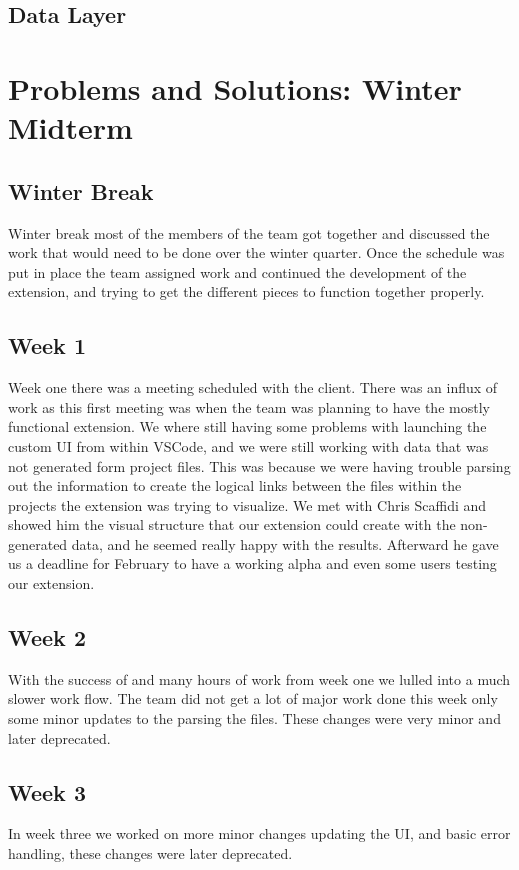 \documentclass[letterpaper,10pt,titlepage,draftclsnofoot,onecolumn,onesided] {IEEEtran}
\begin{document}
	\subsection{Data Layer}

\section{Problems and Solutions: Winter Midterm }
	\subsection{Winter Break}
	Winter break most of the members of the team got together and discussed the work that would need to be done over the winter quarter.
	Once the schedule was put in place the team assigned work and continued the development of the extension, and trying to get the different pieces to function together properly. 
	
	\subsection{Week 1}
	Week one there was a meeting scheduled with the client. 
	There was an influx of work as this first meeting was when the team was planning to have the mostly functional extension. 
	We where still having some problems with launching the custom UI from within VSCode, and we were still working with data that was not generated form project files.
	This was because we were having trouble parsing out the information to create the logical links between the files within the projects the extension was trying to visualize. 
	We met with Chris Scaffidi and showed him the visual structure that our extension could create with the non-generated data, and he seemed really happy with the results.
	Afterward he gave us a deadline for February to have a working alpha and even some users testing our extension. 
	
	\subsection{Week 2}
	With the success of and many hours of work from week one we lulled into a much slower work flow. 
	The team did not get a lot of major work done this week only some minor updates to the parsing the files. 
	These changes were very minor and later deprecated.

	\subsection{Week 3}
	In week three we worked on more minor changes updating the UI, and basic error handling, these changes were later deprecated. 
\end{document}
